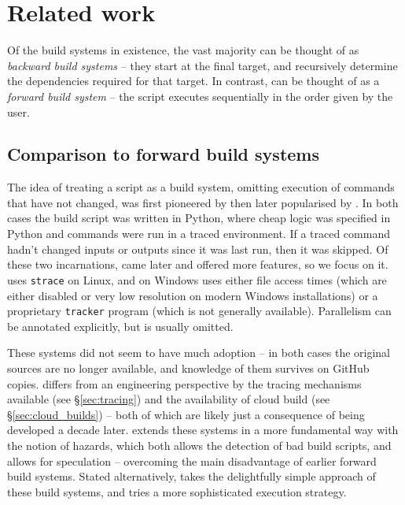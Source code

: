 \section{Related work}
\label{sec:related}

Of the build systems in existence, the vast majority can be thought of as \emph{backward build systems} -- they start at the final target, and recursively determine the dependencies required for that target. In contrast, \Rattle can be thought of as a \emph{forward build system} -- the script executes sequentially in the order given by the user.

\subsection{Comparison to forward build systems}

The idea of treating a script as a build system, omitting execution of commands that have not changed, was first pioneered by \Memoize \cite{memoize} then later popularised by \Fabricate \cite{fabricate}. In both cases the build script was written in Python, where cheap logic was specified in Python and commands were run in a traced environment. If a traced command hadn't changed inputs or outputs since it was last run, then it was skipped. Of these two incarnations, \Fabricate came later and offered more features, so we focus on it. \Fabricate uses \texttt{strace} on Linux, and on Windows uses either file access times (which are either disabled or very low resolution on modern Windows installations) or a proprietary \texttt{tracker} program (which is not generally available). Parallelism can be annotated explicitly, but is usually omitted.

These systems did not seem to have much adoption -- in both cases the original sources are no longer available, and knowledge of them survives on GitHub copies. \Rattle differs from an engineering perspective by the tracing mechanisms available (see \S\ref{sec:tracing}) and the availability of cloud build (see \S\ref{sec:cloud_builds}) -- both of which are likely just a consequence of being developed a decade later. \Rattle extends these systems in a more fundamental way with the notion of hazards, which both allows the detection of bad build scripts, and allows for speculation -- overcoming the main disadvantage of earlier forward build systems. Stated alternatively, \Rattle takes the delightfully simple approach of these build systems, and tries a more sophisticated execution strategy.

